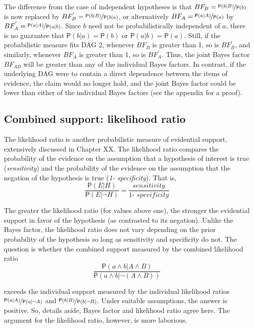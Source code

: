 \documentclass[
  10pt,
  dvipsnames,enabledeprecatedfontcommands]{scrartcl}
\newcommand{\pr}[1]{\ensuremath{\mathsf{P}(#1)}}
\begin{document}
\noindent The difference from the case of independent hypotheses is that
\(BF_B=\nicefrac{\pr{b \vert B}}{\pr{b}}\) is now replaced by
\(BF^{'}_B=\nicefrac{\pr{b \vert B}}{\pr{b\vert a}}\), or alternatively
\(BF_A=\nicefrac{\pr{a \vert A}}{\pr{a}}\) by
\(BF^{'}_A=\nicefrac{\pr{a \vert A}}{\pr{a\vert b}}\). Since \(b\) need
not be probabilistically independent of \(a\), there is no guarantee
that \(\pr{b \vert a}=\pr{b}\) or \(\pr{a \vert b}=\pr{a}\). Still, if
the probabilistic measure fits \textsf{DAG 2}, whenever \(BF_B\) is
greater than 1, so is \(BF^{'}_B\), and similarly, whenever \(BF_A\) is
greater than 1, so is \(BF^{'}_A\). Thus, the joint Bayes factor
\(BF_{AB}\) will be greater than any of the individual Bayes factors. In
contrast, if the underlying \textsf{DAG} were to contain a direct
dependence between the items of evidence, the claim would no longer
hold, and the joint Bayes factor could be lower than either of the
individual Bayes factors (see the appendix for a proof).

\hypertarget{combined-support-likelihood-ratio}{%
\subsection{Combined support: likelihood
ratio}\label{combined-support-likelihood-ratio}}

The likelihood ratio is another probabilistic measure of evidential
support, extensively discussed in Chapter XX.
 The likelihood ratio compares the
probability of the evidence on the assumption that a hypothesis of
interest is true (\textit{sensitivity}) and the probability of the
evidence on the assumption that the negation of the hypothesis is true
(\textit{1- specificity}). That is,
\[\frac{\pr{E \vert H}}{\pr{E \vert \neg H}}=\frac{\textit{sensitivity}}{\textit{1- specificity}}\]

\noindent The greater the likelihood ratio (for values above one), the
stronger the evidential support in favor of the hypothesis (as
contrasted to its negation). Unlike the Bayes factor, the likelihood
ratio does not vary depending on the prior probability of the hypothesis
so long as sensitivity and specificity do not. The question is whether
the combined support measured by the combined likelihood ratio
\[\frac{\pr{a\wedge b \vert A\wedge B}}{\pr{a \wedge b \vert \neg (A\wedge B)}}\]

\noindent exceeds the individual support measured by the individual
likelihood ratios \(\nicefrac{\pr{a \vert A}}{\pr{a \vert \neg A}}\) and
\(\nicefrac{\pr{b \vert B}}{\pr{b \vert \neg B}}\). Under suitable
assumptions, the answer is positive. So, details aside, Bayes factor and
likelihood ratio agree here. The argument for the likelihood ratio,
however, is more laborious.
\end{document}
